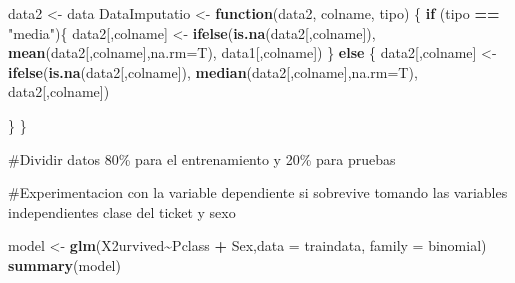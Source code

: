\documentclass[
]{article}
\newenvironment{Shaded}{\begin{snugshade}}{\end{snugshade}}
\newcommand{\AttributeTok}[1]{\textcolor[rgb]{0.13,0.29,0.53}{#1}}
\newcommand{\ConstantTok}[1]{\textcolor[rgb]{0.56,0.35,0.01}{#1}}
\newcommand{\ControlFlowTok}[1]{\textcolor[rgb]{0.13,0.29,0.53}{\textbf{#1}}}
\newcommand{\DecValTok}[1]{\textcolor[rgb]{0.00,0.00,0.81}{#1}}
\newcommand{\FloatTok}[1]{\textcolor[rgb]{0.00,0.00,0.81}{#1}}
\newcommand{\FunctionTok}[1]{\textcolor[rgb]{0.13,0.29,0.53}{\textbf{#1}}}
\newcommand{\NormalTok}[1]{#1}
\newcommand{\OtherTok}[1]{\textcolor[rgb]{0.56,0.35,0.01}{#1}}
\newcommand{\SpecialCharTok}[1]{\textcolor[rgb]{0.81,0.36,0.00}{\textbf{#1}}}
\newcommand{\StringTok}[1]{\textcolor[rgb]{0.31,0.60,0.02}{#1}}
\begin{document}
\begin{Shaded}
\begin{Highlighting}[]
\NormalTok{data2 }\OtherTok{\textless{}{-}}\NormalTok{ data}
\NormalTok{DataImputatio }\OtherTok{\textless{}{-}} \ControlFlowTok{function}\NormalTok{(data2, colname, tipo) \{}
  \ControlFlowTok{if}\NormalTok{ (tipo }\SpecialCharTok{==} \StringTok{"media"}\NormalTok{)\{}
\NormalTok{    data2[,colname] }\OtherTok{\textless{}{-}} \FunctionTok{ifelse}\NormalTok{(}\FunctionTok{is.na}\NormalTok{(data2[,colname]),}
                              \FunctionTok{mean}\NormalTok{(data2[,colname],}\AttributeTok{na.rm=}\NormalTok{T),}
\NormalTok{                              data1[,colname])}
\NormalTok{  \}}
  \ControlFlowTok{else} 
\NormalTok{  \{}
\NormalTok{    data2[,colname] }\OtherTok{\textless{}{-}} \FunctionTok{ifelse}\NormalTok{(}\FunctionTok{is.na}\NormalTok{(data2[,colname]),}
                              \FunctionTok{median}\NormalTok{(data2[,colname],}\AttributeTok{na.rm=}\NormalTok{T),}
\NormalTok{                              data2[,colname])}
    
\NormalTok{  \}}
\NormalTok{\}}
\end{Highlighting}
\end{Shaded}

\#Dividir datos 80\% para el entrenamiento y 20\% para pruebas

\begin{Shaded}
\end{Shaded}

\#Experimentacion con la variable dependiente si sobrevive tomando las
variables independientes clase del ticket y sexo

\begin{Shaded}
\begin{Highlighting}[]
\NormalTok{model }\OtherTok{\textless{}{-}} \FunctionTok{glm}\NormalTok{(X2urvived}\SpecialCharTok{\textasciitilde{}}\NormalTok{Pclass }\SpecialCharTok{+}\NormalTok{ Sex,}\AttributeTok{data =}\NormalTok{ traindata, }\AttributeTok{family =}\NormalTok{ binomial)}
             \FunctionTok{summary}\NormalTok{(model)}
\end{Highlighting}
\end{Shaded}
\end{document}
